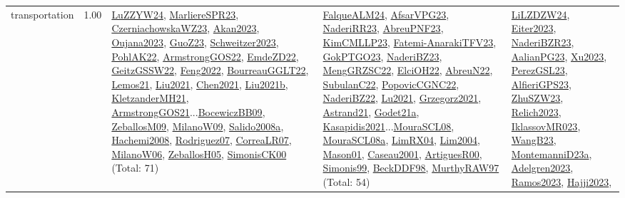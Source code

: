 {\begin{longtable}{p{3cm}r>{\raggedright\arraybackslash}p{6cm}>{\raggedright\arraybackslash}p{6cm}>{\raggedright\arraybackslash}p{8cm}}
\index{transportation}\index{Concepts!transportation}transportation &  1.00 & \hyperref[detail:LuZZYW24]{LuZZYW24}, \hyperref[detail:MarliereSPR23]{MarliereSPR23}, \hyperref[detail:CzerniachowskaWZ23]{CzerniachowskaWZ23}, \hyperref[detail:Akan2023]{Akan2023}, \hyperref[detail:Oujana2023]{Oujana2023}, \hyperref[detail:GuoZ23]{GuoZ23}, \hyperref[detail:Schweitzer2023]{Schweitzer2023}, \hyperref[detail:PohlAK22]{PohlAK22}, \hyperref[detail:ArmstrongGOS22]{ArmstrongGOS22}, \hyperref[detail:EmdeZD22]{EmdeZD22}, \hyperref[detail:GeitzGSSW22]{GeitzGSSW22}, \hyperref[detail:Feng2022]{Feng2022}, \hyperref[detail:BourreauGGLT22]{BourreauGGLT22}, \hyperref[detail:Lemos21]{Lemos21}, \hyperref[detail:Liu2021]{Liu2021}, \hyperref[detail:Chen2021]{Chen2021}, \hyperref[detail:Liu2021b]{Liu2021b}, \hyperref[detail:KletzanderMH21]{KletzanderMH21}, \hyperref[detail:ArmstrongGOS21]{ArmstrongGOS21}...\hyperref[detail:BocewiczBB09]{BocewiczBB09}, \hyperref[detail:ZeballosM09]{ZeballosM09}, \hyperref[detail:MilanoW09]{MilanoW09}, \hyperref[detail:Salido2008a]{Salido2008a}, \hyperref[detail:Hachemi2008]{Hachemi2008}, \hyperref[detail:Rodriguez07]{Rodriguez07}, \hyperref[detail:CorreaLR07]{CorreaLR07}, \hyperref[detail:MilanoW06]{MilanoW06}, \hyperref[detail:ZeballosH05]{ZeballosH05}, \hyperref[detail:SimonisCK00]{SimonisCK00} (Total: 71) & \hyperref[detail:FalqueALM24]{FalqueALM24}, \hyperref[detail:AfsarVPG23]{AfsarVPG23}, \hyperref[detail:NaderiRR23]{NaderiRR23}, \hyperref[detail:AbreuPNF23]{AbreuPNF23}, \hyperref[detail:KimCMLLP23]{KimCMLLP23}, \hyperref[detail:Fatemi-AnarakiTFV23]{Fatemi-AnarakiTFV23}, \hyperref[detail:GokPTGO23]{GokPTGO23}, \hyperref[detail:NaderiBZ23]{NaderiBZ23}, \hyperref[detail:MengGRZSC22]{MengGRZSC22}, \hyperref[detail:ElciOH22]{ElciOH22}, \hyperref[detail:AbreuN22]{AbreuN22}, \hyperref[detail:SubulanC22]{SubulanC22}, \hyperref[detail:PopovicCGNC22]{PopovicCGNC22}, \hyperref[detail:NaderiBZ22]{NaderiBZ22}, \hyperref[detail:Lu2021]{Lu2021}, \hyperref[detail:Grzegorz2021]{Grzegorz2021}, \hyperref[detail:Astrand21]{Astrand21}, \hyperref[detail:Godet21a]{Godet21a}, \hyperref[detail:Kasapidis2021]{Kasapidis2021}...\hyperref[detail:MouraSCL08]{MouraSCL08}, \hyperref[detail:MouraSCL08a]{MouraSCL08a}, \hyperref[detail:LimRX04]{LimRX04}, \hyperref[detail:Lim2004]{Lim2004}, \hyperref[detail:Mason01]{Mason01}, \hyperref[detail:Caseau2001]{Caseau2001}, \hyperref[detail:ArtiguesR00]{ArtiguesR00}, \hyperref[detail:Simonis99]{Simonis99}, \hyperref[detail:BeckDDF98]{BeckDDF98}, \hyperref[detail:MurthyRAW97]{MurthyRAW97} (Total: 54) & \hyperref[detail:LiLZDZW24]{LiLZDZW24}, \hyperref[detail:Eiter2023]{Eiter2023}, \hyperref[detail:NaderiBZR23]{NaderiBZR23}, \hyperref[detail:AalianPG23]{AalianPG23}, \hyperref[detail:Xu2023]{Xu2023}, \hyperref[detail:PerezGSL23]{PerezGSL23}, \hyperref[detail:AlfieriGPS23]{AlfieriGPS23}, \hyperref[detail:ZhuSZW23]{ZhuSZW23}, \hyperref[detail:Relich2023]{Relich2023}, \hyperref[detail:IklassovMR023]{IklassovMR023}, \hyperref[detail:WangB23]{WangB23}, \hyperref[detail:MontemanniD23a]{MontemanniD23a}, \hyperref[detail:Adelgren2023]{Adelgren2023}, \hyperref[detail:Ramos2023]{Ramos2023}, \hyperref[detail:Hajji2023]{Hajji2023}, 
\end{longtable}}
